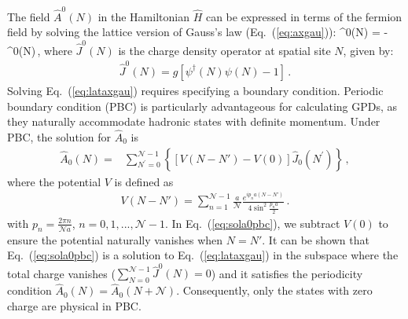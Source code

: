 \documentclass[aps,prd,twocolumn,superscriptaddress,notitlepage,nofootinbib,preprintnumbers]{revtex4-1}
\def\bea#1\eea{\begin{align}#1\end{align}}
\begin{document}
The field $\hat{A}^0(N)$ in the Hamiltonian $\hat{H}$ can be expressed in terms of the fermion field by solving the lattice version of Gauss's law (Eq.~(\ref{eq:axgau})):
\bea\label{eq:lataxgau}
    \hat{\Delta} ^0(N) = -^0(N)\,,
\eea
where $\hat{J}^0(N)$ is the charge density operator at spatial site $N$, given by:
\begin{align}
    \hat{J}^0(N) = g\left[\psi^\dagger(N)\psi(N)-1\right]\,.
\end{align}
Solving Eq.~(\ref{eq:lataxgau}) requires specifying a boundary condition. Periodic boundary condition (PBC) is particularly advantageous for calculating GPDs, as they naturally accommodate hadronic states with definite momentum.
Under PBC, the solution for $\hat{A}_0$ is
\begin{align}
    \label{eq:sola0pbc}
    \hat{A}_0(N) =&  \sum_{N^\prime=0}^{\mathcal{N}-1}\left\{\left[{V}(N-N')-{V}(0)\right]\hat{J}_0(N^\prime)\right\}\,,
\end{align}
where the potential $V$ is defined as
\begin{align}
    {V}(N-N') = \sum_{n = 1}^{\mathcal{N}-1} \frac{a}{\mathcal{N}} \frac{e^{i p_n a (N-N')}}{4\sin^2 \frac{p_n a}{2}}\,.
\end{align}
with $p_n = \frac{2\pi n}{\mathcal{N} a}$, $n=0, 1,...,\mathcal{N}-1$. In Eq.~(\ref{eq:sola0pbc}), we subtract ${V}(0)$ to ensure the potential naturally vanishes when $N=N'$.
It can be shown that Eq.~(\ref{eq:sola0pbc}) is a solution to Eq.~(\ref{eq:lataxgau}) in the subspace where the total charge vanishes ($\sum_{N=0}^{\mathcal{N}-1} \hat{J}^0(N) = 0$) and it satisfies the periodicity condition $\hat{A}_0(N) = \hat{A}_0(N+\mathcal{N})$.
Consequently, only the states with zero charge are physical in PBC.
\end{document}
